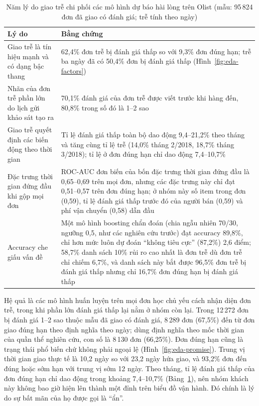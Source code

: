 \documentclass[12pt,a4paper]{report}
\begin{document}
\begin{table}[htbp]\centering\small
\caption{Năm lý do giao trễ chi phối các mô hình dự báo hài lòng trên Olist (mẫu: 95\,824 đơn đã giao có đánh giá; trễ tính theo ngày)}\label{tab:eda-reasons}
\begin{tabular}{p{4.3cm}p{9.2cm}}
\toprule
Lý do & Bằng chứng \\
\midrule
Giao trễ là tín hiệu mạnh và có dạng bậc thang & 62,4\% đơn trễ bị đánh giá thấp so với 9,3\% đơn đúng hạn; trễ ba ngày đã có 50,4\% đơn bị đánh giá thấp (Hình~\ref{fig:eda-factors}) \\
Nhãn của đơn trễ phần lớn do lịch gửi khảo sát tạo ra & 70,1\% đánh giá của đơn trễ được viết trước khi hàng đến, 80,8\% trong số đó là 1--2 sao \\
Giao trễ quyết định các biến động theo thời gian & Tỉ lệ đánh giá thấp toàn bộ dao động 9,4--21,2\% theo tháng và tăng cùng tỉ lệ trễ (14,0\% tháng 2/2018, 18,7\% tháng 3/2018); tỉ lệ ở đơn đúng hạn chỉ dao động 7,4--10,7\% \\
Đặc trưng thời gian đứng đầu khi gộp mọi đơn & ROC-AUC đơn biến của bốn đặc trưng thời gian đứng đầu là 0,65--0,69 trên mọi đơn, nhưng các đặc trưng này chỉ đạt 0,51--0,57 trên đơn đúng hạn; ở nhóm này số item trong đơn (0,59), tỉ lệ đánh giá thấp trước đó của người bán (0,59) và phí vận chuyển (0,58) dẫn đầu \\
Accuracy che giấu vấn đề & Một mô hình boosting chẩn đoán (chia ngẫu nhiên 70/30, ngưỡng 0,5, như các nghiên cứu trước) đạt accuracy 89,8\%, chỉ hơn mức luôn dự đoán ``không tiêu cực'' (87,2\%) 2,6 điểm; 58,7\% danh sách 10\% rủi ro cao nhất là đơn trễ dù đơn trễ chỉ chiếm 6,7\%, và danh sách này bắt được 96,5\% đơn trễ bị đánh giá thấp nhưng chỉ 16,7\% đơn đúng hạn bị đánh giá thấp \\
\bottomrule
\end{tabular}
\end{table}

Hệ quả là các mô hình huấn luyện trên mọi đơn học chủ yếu cách nhận diện đơn trễ, trong khi phần lớn đánh giá thấp lại nằm ở nhóm còn lại. Trong 12\,272 đơn bị đánh giá 1--2 sao thuộc mẫu đã giao có đánh giá, 8\,289 đơn (67,5\%) đến từ đơn giao đúng hạn theo định nghĩa theo ngày; dùng định nghĩa theo mốc thời gian của quần thể nghiên cứu, con số là 8\,130 đơn (66,25\%). Đơn đúng hạn cũng là trạng thái phổ biến chứ không phải ngoại lệ (Hình~\ref{fig:eda-promise}). Trung vị thời gian giao thực tế là 10,2 ngày so với 23,2 ngày hứa giao, và 93,2\% đơn đến đúng hoặc sớm hạn với trung vị sớm 12 ngày. Theo tháng, tỉ lệ đánh giá thấp của đơn đúng hạn chỉ dao động trong khoảng 7,4--10,7\% (Bảng~\ref{tab:eda-reasons}), nên nhóm khách này không bao giờ hiện lên thành một đỉnh trên biểu đồ vận hành. Đó chính là lý do sự bất mãn của họ được gọi là ``ẩn''.
\end{document}
